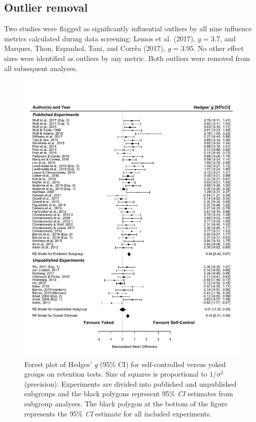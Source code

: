\documentclass[
  english,
  man, donotrepeattitle,floatsintext]{apa7}
\begin{document}
\hypertarget{outlier-removal}{%
\subsection{Outlier removal}\label{outlier-removal}}

Two studies were flagged as significantly influential outliers by all nine influence metrics calculated during data screening: Lemos et al. (2017), \emph{g} = 3.7, and Marques, Thon, Espanhol, Tani, and Corrêa (2017), \emph{g} = 3.95. No other effect sizes were identified as outliers by any metric. Both outliers were removed from all subsequent analyses.



\begin{figure}

{\centering \includegraphics[height=0.77\textheight]{../../figs/fig3} 

}

\caption{Forest plot of Hedges' \emph{g} (95\% CI) for self-controlled versus yoked groups on retention tests. Size of squares is proportional to \(1/\sigma^2\) (precision). Experiments are divided into published and unpublished subgroups and the black polygons represent 95\% \emph{CI} estimates from subgroup analyses. The black polygon at the bottom of the figure represents the 95\% \emph{CI} estimate for all included experiments.}\label{fig:fig3}
\end{figure}
\end{document}

